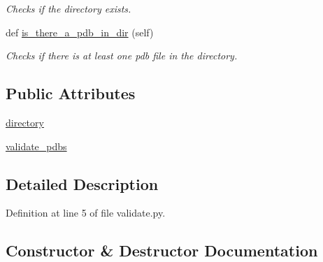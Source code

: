 \begin{DoxyCompactItemize}
\begin{DoxyCompactList}\small\item\em Checks if the directory exists. \end{DoxyCompactList}\item 
def \hyperlink{classfragalysis__api_1_1xcimporter_1_1validate_1_1_validate_a7203bedad575f779345a78f7880a58a2}{is\+\_\+there\+\_\+a\+\_\+pdb\+\_\+in\+\_\+dir} (self)
\begin{DoxyCompactList}\small\item\em Checks if there is at least one pdb file in the directory. \end{DoxyCompactList}\end{DoxyCompactItemize}
\subsection*{Public Attributes}
\begin{DoxyCompactItemize}
\item 
\hyperlink{classfragalysis__api_1_1xcimporter_1_1validate_1_1_validate_a4ef4b2db6e032059c04e6dead4a8998f}{directory}
\item 
\hyperlink{classfragalysis__api_1_1xcimporter_1_1validate_1_1_validate_a73358370d6a752874ee4641f4709eb67}{validate\+\_\+pdbs}
\end{DoxyCompactItemize}


\subsection{Detailed Description}


Definition at line 5 of file validate.\+py.



\subsection{Constructor \& Destructor Documentation}
\mbox{\label{classfragalysis__api_1_1xcimporter_1_1validate_1_1_validate_a27319a45d204d3a917eb000a0e636e3e}} 
